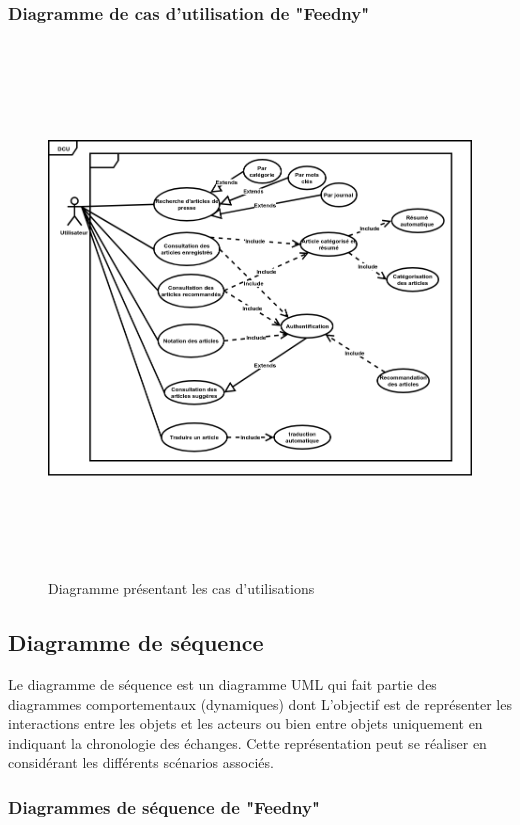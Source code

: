 \subsubsection{Diagramme de cas d'utilisation de "Feedny"}
\begin{figure}[H]
    \centering
    \includegraphics[height=400pt,width=350pt]{img/chapter3/diagcasdutilisation.png}
    \caption{Diagramme présentant les cas d'utilisations}
\end{figure}

\subsection{Diagramme de séquence}
Le diagramme de séquence est un diagramme UML qui fait partie des diagrammes comportementaux (dynamiques) dont L'objectif est de représenter les interactions entre les objets et les acteurs ou bien entre objets uniquement  en indiquant la chronologie des échanges. Cette représentation peut se réaliser en considérant les différents scénarios associés.\cite{UML}


\subsubsection{Diagrammes de séquence de "Feedny"}

